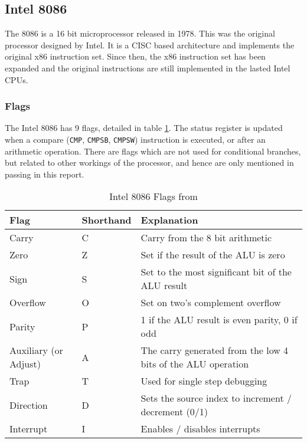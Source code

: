 \documentclass[12pt,a4paper]{article}
\begin{document}
\begin{bibunit}[is-unsrt]
\subsection{Intel 8086}

The 8086 is a 16 bit microprocessor released in 1978.
This was the original processor designed by Intel.
It is a CISC based architecture and implements the original x86 instruction set.
Since then, the x86 instruction set has been expanded and the original instructions are still implemented in the lasted Intel CPUs.

\subsubsection{Flags}

The Intel 8086 has 9 flags, detailed in table \ref{tab:Intel:flags}.
The status register is updated when a compare (\texttt{CMP}, \texttt{CMPSB}, \texttt{CMPSW}) instruction is executed, or after an arithmetic operation.
There are flags which are not used for conditional branches, but related to other workings of the processor, and hence are only mentioned in passing in this report.

\begin{table}
\centering
\caption{Intel 8086 Flags from \cite{Intel:flags}}
\label{tab:Intel:flags}
\begin{tabular}{p{}p{}p{}}\hline
Flag & Shorthand & Explanation \\ \hline
Carry & C & Carry from the 8 bit arithmetic \\
Zero & Z & Set if the result of the ALU is zero \\
Sign & S & Set to the most significant bit of the ALU result \\
Overflow & O & Set on two's complement overflow \\
Parity & P & 1 if the ALU result is even parity, 0 if odd \cite{flag:p} \\
Auxiliary (or Adjust) & A & The carry generated from the low 4 bits of the ALU operation \cite{flag:a}\\
Trap & T & Used for single step debugging \cite{flag:t} \\
Direction & D & Sets the source index to increment / decrement (0/1) \cite{flag:d} \\
Interrupt & I & Enables / disables interrupts \cite{flag:i} \\
\end{tabular}
\end{table}


\end{bibunit}
\end{document}
